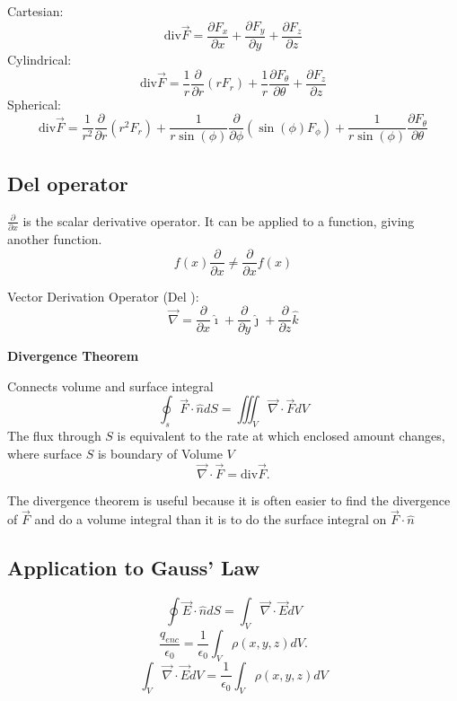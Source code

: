 Cartesian:
\begin{equation}
	\label{}
	\mbox{div}\vec{F}=\frac{\partial F_{x}}{\partial x}+\frac{\partial F_{y}}{\partial y}+\frac{\partial F_{z}}{\partial z}
\end{equation}
Cylindrical:
\begin{equation}
	\label{}
	\mbox{div}\vec{F}=\frac{1}{r}\frac{\partial}{\partial r}(rF_{r})+\frac{1}{r}\frac{\partial F_{\theta}}{\partial\theta}+\frac{\partial F_{z}}{\partial z}
\end{equation}
Spherical:
\begin{equation}
	\label{}
\mbox{div}\vec{F}=\frac{1}{r^{2}}\frac{\partial}{\partial r}(r^{2}F_{r})+\frac{1}{r\sin(\phi)}\frac{\partial}{\partial \phi}(\sin(\phi)F_{\phi})+\frac{1}{r\sin(\phi)}\frac{\partial F_{\theta}}{\partial\theta}
\end{equation}

\subsection{Del operator}
$\frac{\partial}{\partial x}$ is the scalar derivative operator. It can be applied to a function, giving another function.
\[
	f(x)\frac{\partial}{\partial x}\neq\frac{\partial}{\partial x}f(x)
\] 

Vector Derivation Operator (Del ):
\begin{equation}
	\label{}
	\vec{\nabla}=\frac{\partial}{\partial x}\hat{\imath}+\frac{\partial}{\partial y}\hat{\jmath}+\frac{\partial}{\partial z}\hat{k}
\end{equation}

\textbf{Divergence Theorem}

Connects volume and surface integral
\begin{equation}
	\label{}
	\oint_{s}\vec{F}\cdot\hat{n}dS=\iiint_{V}\vec{\nabla}\cdot\vec{F}dV
\end{equation}
The flux through $S$ is equivalent to the rate at which enclosed amount changes, where surface $S$ is boundary of Volume $V$
\[
	\vec{\nabla}\cdot\vec{F}=\mbox{div}\vec{F}.\] 

The divergence theorem is useful because it is often easier to find the divergence of $\vec{F}$ and do a volume integral than it is to do the surface integral on $\vec{F}\cdot\hat{n}$

\subsection{Application to Gauss' Law}
\[
\oint\vec{E}\cdot\hat{n}dS=\int_{V}\vec{\nabla}\cdot\vec{E}dV
\]
\[
\frac{q_{enc}}{\epsilon_0}=\frac{1}{\epsilon_0}\int_{V}\rho(x,y,z)dV.\] 
\begin{equation}
	\label{}
	\int_{V}\vec{\nabla}\cdot\vec{E}dV=\frac{1}{\epsilon_0}\int_{V}\rho(x,y,z)dV
\end{equation}

